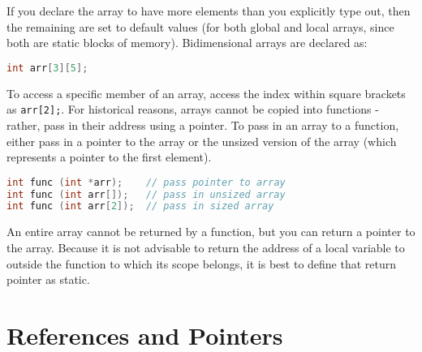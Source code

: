 \documentclass[10pt]{article}
\begin{document}
If you declare the array to have more elements than you explicitly type out, then the remaining are set to default values (for both global and local arrays, since both are static blocks of memory). Bidimensional arrays are declared as:

\begin{lstlisting}[language=C++]
int arr[3][5];
\end{lstlisting}

To access a specific member of an array, access the index within square brackets as \texttt{arr[2];}. For historical reasons, arrays cannot be copied into functions - rather, pass in their address using a pointer. To pass in an array to a function, either pass in a pointer to the array or the unsized version of the array (which represents a pointer to the first element).

\begin{lstlisting}[language=C++]
int func (int *arr); 	// pass pointer to array
int func (int arr[]); 	// pass in unsized array
int func (int arr[2]); 	// pass in sized array
\end{lstlisting}

An entire array cannot be returned by a function, but you can return a pointer to the array. Because it is not advisable to return the address of a local variable to outside the function to which its scope belongs, it is best to define that return pointer as static. 

\section{References and Pointers}
\end{document}
